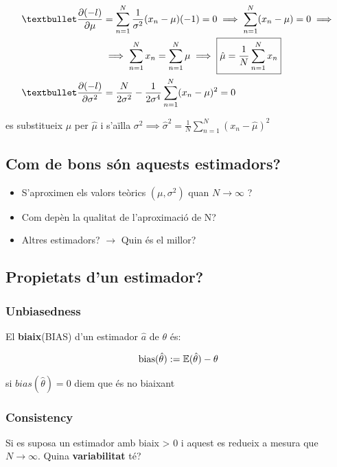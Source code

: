 \begin{align*}
	& \begin{aligned}
		 \textbullet \frac{\partial(-l)}{\partial\mu} &= \sum_{n=1}^N \frac{1}{\sigma^2} (x_n-\mu)(-1) = 0 
		\implies \sum_{n=1}^N (x_n - \mu) = 0 \implies  \\
		& \implies \sum_{n=1}^N x_n = \sum_{n=1}^N \mu \implies \boxed{\hat{\mu} = 
		\frac{1}{N}\sum_{n=1}^N x_n}
	\end{aligned} \\
	& \textbullet \frac{\partial(-l)}{\partial\sigma^2} = \frac{N}{2\sigma^2} - \frac{1}{2\sigma^4}\sum_{n=1}^N (x_n - \mu)^2 = 0
\end{align*}

es substitueix $\mu$ per $\hat{\mu}$ i s'aïlla $\sigma^2 \implies \hat{\sigma}^2 = \frac{1}{N} \sum_{n=1}^N (x_n - \hat{\mu})^2$ 


\subsection{Com de bons són aquests estimadors?}

\begin{itemize}
	\item S'aproximen els valors teòrics $(\mu, \sigma^2)$ quan $N\rightarrow\infty$ ?
	\item Com depèn la qualitat de l'aproximació de N?
	\item Altres estimadors? $\rightarrow$ Quin és el millor?
\end{itemize}

\subsection{Propietats d'un estimador?}

\subsubsection{Unbiasedness}
	
El \textbf{biaix}(BIAS) d'un estimador $\hat{a}$ de $\theta$ és:

$$
\operatorname{bias}(\hat{\theta}) := \mathbb{E}(\hat{\theta}) - \theta
$$

si $bias(\hat{\theta}) = 0$ diem que és no biaixant
	
\subsubsection{Consistency}
	Si es suposa un estimador amb biaix > 0 i aquest es redueix a mesura que $N \to \infty$. Quina \textbf{variabilitat} té?

